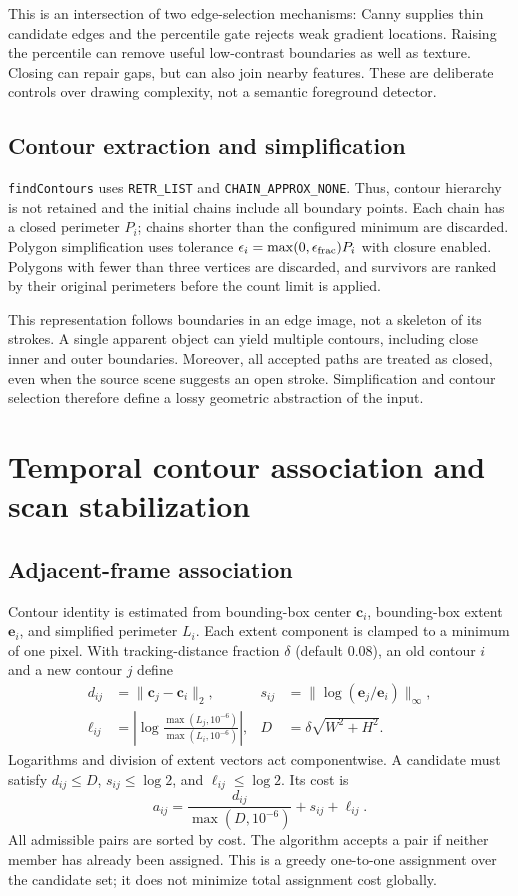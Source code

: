 \documentclass[11pt,a4paper]{article}
\newcommand{\code}[1]{\texttt{#1}}
\begin{document}
This is an intersection of two edge-selection mechanisms: Canny supplies thin candidate edges and the percentile gate rejects weak gradient locations. Raising the percentile can remove useful low-contrast boundaries as well as texture. Closing can repair gaps, but can also join nearby features. These are deliberate controls over drawing complexity, not a semantic foreground detector.

\subsection{Contour extraction and simplification}
\code{findContours} uses \code{RETR\_LIST} and \code{CHAIN\_APPROX\_NONE}. Thus, contour hierarchy is not retained and the initial chains include all boundary points. Each chain has a closed perimeter $P_i$; chains shorter than the configured minimum are discarded. Polygon simplification uses tolerance $\epsilon_i=\max(0,\epsilon_{\rm frac})P_i$ with closure enabled. Polygons with fewer than three vertices are discarded, and survivors are ranked by their original perimeters before the count limit is applied.

This representation follows boundaries in an edge image, not a skeleton of its strokes. A single apparent object can yield multiple contours, including close inner and outer boundaries. Moreover, all accepted paths are treated as closed, even when the source scene suggests an open stroke. Simplification and contour selection therefore define a lossy geometric abstraction of the input.

\section{Temporal contour association and scan stabilization}
\subsection{Adjacent-frame association}
Contour identity is estimated from bounding-box center $\mathbf c_i$, bounding-box extent $\mathbf e_i$, and simplified perimeter $L_i$. Each extent component is clamped to a minimum of one pixel. With tracking-distance fraction $\delta$ (default 0.08), an old contour $i$ and a new contour $j$ define
\begin{align}
 d_{ij}&=\|\mathbf c_j-\mathbf c_i\|_2, &
 s_{ij}&=\|\log(\mathbf e_j/\mathbf e_i)\|_\infty,\\
 \ell_{ij}&=\left|\log\frac{\max(L_j,10^{-6})}{\max(L_i,10^{-6})}\right|, &
 D&=\delta\sqrt{W^2+H^2}.
\end{align}
Logarithms and division of extent vectors act componentwise. A candidate must satisfy $d_{ij}\leq D$, $s_{ij}\leq\log2$, and $\ell_{ij}\leq\log2$. Its cost is
\begin{equation}
 a_{ij}=\frac{d_{ij}}{\max(D,10^{-6})}+s_{ij}+\ell_{ij}.
 \label{eq:association}
\end{equation}
All admissible pairs are sorted by cost. The algorithm accepts a pair if neither member has already been assigned. This is a greedy one-to-one assignment over the candidate set; it does not minimize total assignment cost globally.
\end{document}
